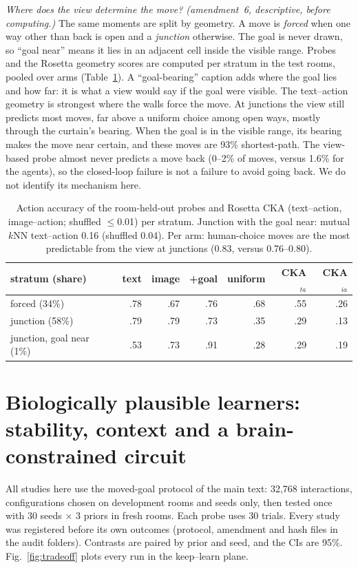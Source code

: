 \documentclass[10pt,onecolumn,letterpaper]{article}
\begin{document}
\emph{Where does the view determine the move? (amendment~6, descriptive, before computing.)} The same moments are
split by geometry. A move is \emph{forced} when one way other than back is open and a \emph{junction} otherwise. The
goal is never drawn, so ``goal near'' means it lies in an adjacent cell inside the visible range. Probes and the Rosetta
geometry scores are computed per stratum in the test rooms, pooled over arms (Table~\ref{tab:strata}). A ``goal-bearing''
caption adds where the goal lies and how far: it is what a view would say if the goal were visible. The text--action
geometry is strongest where the walls force the move. At junctions the view still predicts most moves, far above a uniform
choice among open ways, mostly through the curtain's bearing. When the goal is in the visible range, its bearing makes the
move near certain, and these moves are 93\% shortest-path. The view-based probe almost never predicts a move back (0--2\%
of moves, versus 1.6\% for the agents), so the closed-loop failure is not a failure to avoid going back. We do not identify
its mechanism here.
\begin{table}[h]\centering\small\setlength{\tabcolsep}{3pt}
\begin{tabular}{lrrrrrr}\toprule
stratum (share) & text & image & +goal & uniform & CKA$_{ta}$ & CKA$_{ia}$\\\midrule
forced (34\%) & .78 & .67 & .76 & .68 & .55 & .26\\
junction (58\%) & .79 & .79 & .73 & .35 & .29 & .13\\
junction, goal near (1\%) & .53 & .73 & .91 & .28 & .29 & .19\\\bottomrule
\end{tabular}
\caption{Action accuracy of the room-held-out probes and Rosetta CKA (text--action, image--action; shuffled $\le$0.01) per
stratum. Junction with the goal near: mutual $k$NN text--action 0.16 (shuffled 0.04). Per arm: human-choice moves are
the most predictable from the view at junctions (0.83, versus 0.76--0.80).}\label{tab:strata}
\end{table}

\section{Biologically plausible learners: stability, context and a brain-constrained circuit}
\label{sec:bio}
All studies here use the moved-goal protocol of the main text: 32,768 interactions, configurations chosen on development
rooms and seeds only, then tested once with 30 seeds $\times$ 3 priors in fresh rooms. Each probe uses 30 trials. Every
study was registered before its own outcomes (protocol, amendment and hash files in the audit folders). Contrasts are
paired by prior and seed, and the CIs are 95\%. Fig.~\ref{fig:tradeoff} plots every run in the keep--learn plane.
\end{document}
